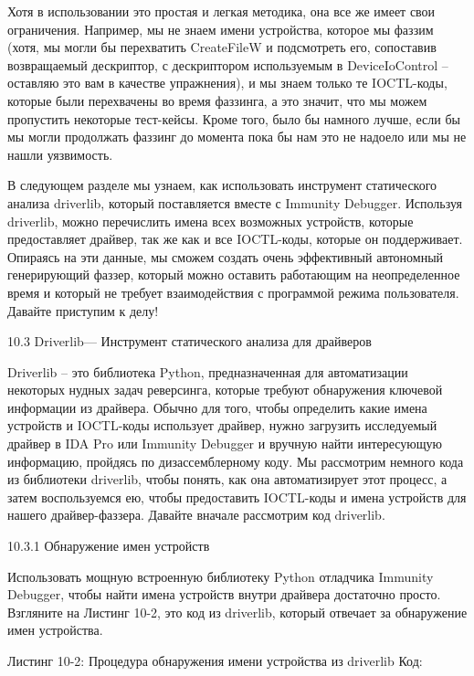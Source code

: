 \documentclass[12pt, a4paper, oneside]{book}
\begin{document}
Хотя в использовании это простая и легкая методика, она все же имеет свои ограничения. Например, мы не знаем имени устройства, которое мы фаззим (хотя, мы могли бы перехватить CreateFileW и подсмотреть его, сопоставив возвращаемый дескриптор, с дескриптором используемым в DeviceIoControl – оставляю это вам в качестве упражнения), и мы знаем только те IOCTL-коды, которые были перехвачены во время фаззинга, а это значит, что мы можем пропустить некоторые тест-кейсы. Кроме того, было бы намного лучше, если бы мы могли продолжать фаззинг до момента пока бы нам это не надоело или мы не нашли уязвимость. 

В следующем разделе мы узнаем, как использовать инструмент статического анализа driverlib, который поставляется вместе с Immunity Debugger. Используя driverlib, можно перечислить имена всех возможных устройств, которые предоставляет драйвер, так же как и все IOCTL-коды, которые он поддерживает. Опираясь на эти данные, мы сможем создать очень эффективный автономный генерирующий фаззер, который можно оставить работающим на неопределенное время и который не требует взаимодействия с программой режима пользователя. Давайте приступим к делу!


10.3 Driverlib— Инструмент статического анализа для драйверов

Driverlib – это библиотека Python, предназначенная для автоматизации некоторых нудных задач реверсинга, которые требуют обнаружения ключевой информации из драйвера. Обычно для того, чтобы определить какие имена устройств и IOCTL-коды использует драйвер, нужно загрузить исследуемый драйвер в IDA Pro или Immunity Debugger и вручную найти интересующую информацию, пройдясь по дизассемблерному коду. Мы рассмотрим немного кода из библиотеки driverlib, чтобы понять, как она автоматизирует этот процесс, а затем воспользуемся ею, чтобы предоставить IOCTL-коды и имена устройств для нашего драйвер-фаззера. Давайте вначале рассмотрим код driverlib.

10.3.1 Обнаружение имен устройств

Использовать мощную встроенную библиотеку Python отладчика Immunity Debugger, чтобы найти имена устройств внутри драйвера достаточно просто. Взгляните на Листинг 10-2, это код из driverlib, который отвечает за обнаружение имен устройства.

Листинг 10-2: Процедура обнаружения имени устройства из driverlib
Код:

\end{document}
